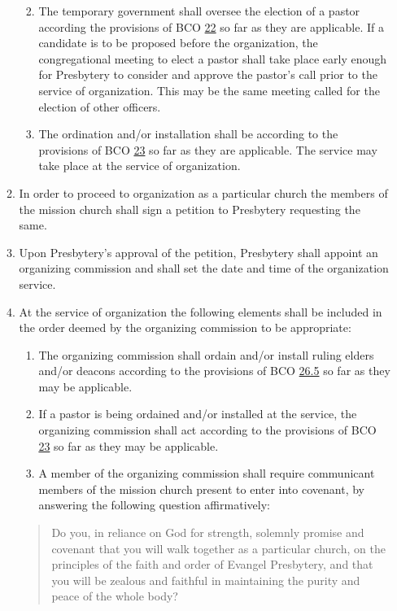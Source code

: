 \documentclass[
]{book}
\providecommand{\tightlist}{%
  \setlength{\itemsep}{0pt}\setlength{\parskip}{0pt}}
\begin{document}
\begin{enumerate}
\begin{enumerate}
    \begin{enumerate}
    \def\labelenumiii{\roman{enumiii}.}
    \tightlist
    \item
      The temporary government shall oversee the election of a pastor according the provisions of BCO \protect\hyperlink{22}{22} so far as they are applicable. If a candidate is to be proposed before the organization, the congregational meeting to elect a pastor shall take place early enough for Presbytery to consider and approve the pastor's call prior to the service of organization. This may be the same meeting called for the election of other officers.
    \item
      The ordination and/or installation shall be according to the provisions of BCO \protect\hyperlink{23}{23} so far as they are applicable. The service may take place at the service of organization.
    \end{enumerate}
  \item
    In order to proceed to organization as a particular church the members of the mission church shall sign a petition to Presbytery requesting the same.
  \item
    Upon Presbytery's approval of the petition, Presbytery shall appoint an organizing commission and shall set the date and time of the organization service.
  \item
    At the service of organization the following elements shall be included in the order deemed by the organizing commission to be appropriate:

    \begin{enumerate}
    \def\labelenumiii{\roman{enumiii}.}
    \tightlist
    \item
      The organizing commission shall ordain and/or install ruling elders and/or deacons according to the provisions of BCO \protect\hyperlink{26.5}{26.5} so far as they may be applicable.
    \item
      If a pastor is being ordained and/or installed at the service, the organizing commission shall act according to the provisions of BCO \protect\hyperlink{23}{23} so far as they may be applicable.
    \item
      A member of the organizing commission shall require communicant members of the mission church present to enter into covenant, by answering the following question affirmatively:
    \end{enumerate}

    \begin{quote}
    Do you, in reliance on God for strength, solemnly promise and covenant that you will walk together as a particular church, on the principles of the faith and order of Evangel Presbytery, and that you will be zealous and faithful in maintaining the purity and peace of the whole body?
    \end{quote}


\end{enumerate}
\end{enumerate}
\end{document}
